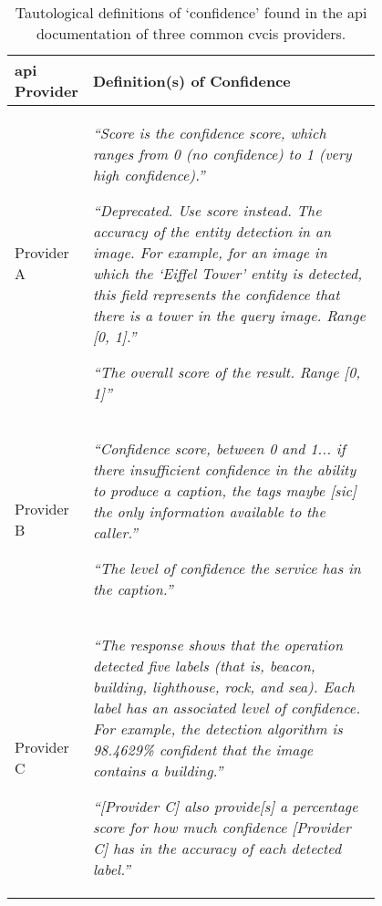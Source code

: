 \begin{table}[hbt]
  \centering
  \caption[Tautological definitions of confidence found in API documentation]{Tautological definitions of `confidence' found in the \gls{api} documentation of three common \gls{cvcis} providers.}
  \label{tab:introduction:motivation:scenario:pam:tautological}
  \begin{tabular}{l|p{0.8\linewidth}}
    \toprule
    \bfseries \gls{api} Provider &
    \bfseries Definition(s) of Confidence \\
    \midrule
    Provider A &
      \itshape  
      ``Score is the confidence score, which ranges from 0 (no confidence) to 1 (very high confidence).''
      \upshape
      \citep{Google:ConfidenceScore_DocsLabel}
      \bigskip
      
      \itshape  
      ``Deprecated. Use score instead. The accuracy of the entity detection in an image. For example, for an image in which the `Eiffel Tower' entity is detected, this field represents the confidence that there is a tower in the query image. Range [0, 1].'' 
      \upshape
      \citep{Google:ConfidenceScore_DotNet} 
      \bigskip
      
      \itshape  
      ``The overall score of the result. Range [0, 1]''
      \upshape
      \citep{Google:ConfidenceScore_DotNet} 
      \bigskip
    \\ 
    Provider B &
      \itshape  
        ``Confidence score, between 0 and 1... if there insufficient confidence in the ability to produce a caption, the tags maybe [sic] the only information available to the caller.''
      \upshape
      \citep{Azure:ConfidenceScore_HowToCall}
      \bigskip
      
      \itshape  
        ``The level of confidence the service has in the caption.''
      \upshape
      \citep{Azure:ConfidenceScore_JavaDocs}    
      \bigskip
    \\
    Provider C &
      \itshape  
        ``The response shows that the operation detected five labels (that is, beacon, building, lighthouse, rock, and sea). Each label has an associated level of confidence. For example, the detection algorithm is 98.4629\% confident that the image contains a building.''
      \upshape
      \citep{AWS:ConfidenceScore_DetectLabel}
      \bigskip
      
      \itshape  
        ``[Provider C] also provide[s] a percentage score for how much confidence [Provider C] has in the accuracy of each detected label.''
      \upshape
      \citep{AWS:ConfidenceScore_DetectObjScene}
    \\
    \bottomrule
  \end{tabular}
\end{table}
